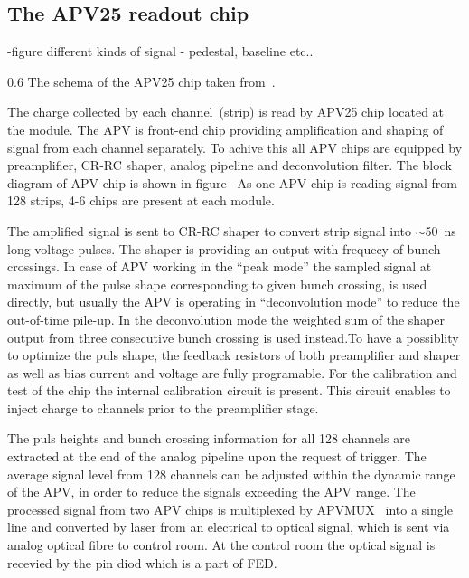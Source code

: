 

\subsection{The APV25 readout chip}

-figure different kinds of signal - pedestal, baseline etc..

                 {0.6}       %
                 {The schema of the APV25 chip taken from~\cite{Friedl:2001kra}.} %

The charge collected by each channel~(strip) is read by APV25 chip located at the module. The APV is front-end chip providing amplification and shaping of signal from each channel separately. To achive this all APV chips are equipped by preamplifier, CR-RC shaper, analog pipeline and deconvolution filter. The block diagram of APV chip is shown in figure~ As one APV chip is reading signal from 128 strips, 4-6 chips are present at each module.

The amplified signal is sent to CR-RC shaper to convert strip signal into $\sim$50~ns long voltage pulses. The shaper is providing an output with frequecy of bunch crossings. In case of APV working in the ``peak mode'' the sampled signal at maximum of the pulse shape corresponding to given bunch crossing, is used directly, but usually the APV is operating in ``deconvolution mode'' to reduce the out-of-time pile-up. In the deconvolution mode the weighted sum of the shaper output from three consecutive bunch crossing is used instead.To have a possiblity to optimize the puls shape, the feedback resistors of both preamplifier and shaper as well as  bias current and voltage are fully programable. For the calibration and test of the chip the internal calibration circuit is present. This circuit enables to inject charge to channels prior to the preamplifier stage.

The puls heights and bunch crossing information for all 128 channels are extracted at the end of the analog pipeline upon the request of trigger. The average signal level from 128 channels can be adjusted within the dynamic range of the APV, in order to reduce the signals exceeding the APV range. The processed signal from two APV chips is multiplexed by APVMUX~\cite{Ball:2007zza} into a single line and converted by laser from an electrical to optical signal, which is sent via analog optical fibre to control room. At the control room the optical signal is recevied by the pin diod which is a part of FED.

